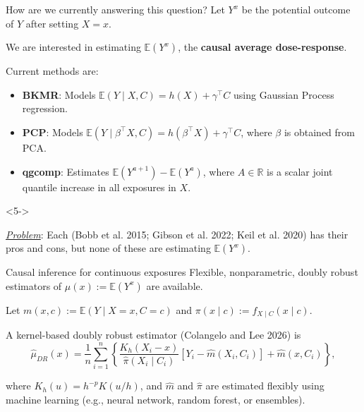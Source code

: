 \documentclass[
  ignorenonframetext,
  aspectratio=169,
  11pt]{beamer}
\newcounter{none} %
\providecommand{\tightlist}{%
  \setlength{\itemsep}{0pt}\setlength{\parskip}{0pt}}
\begin{document}
\begin{frame}{How are we currently answering this question?}
\protect{}\label{how-are-we-currently-answering-this-question}
Let \(Y^x\) be the potential outcome of \(Y\) after setting \(X=x\).

We are interested in estimating \(\mathbb{E}(Y^x)\), the
\textbf{causal average dose-response}.

\pause

Current methods are:

\begin{itemize}[<+->]
\tightlist
\item
  \textbf{BKMR}: Models \(\mathbb{E}(Y\mid X,C)=h(X)+\gamma^\top C\)
  using Gaussian Process regression.
\item
  \textbf{PCP}: Models
  \(\mathbb{E}(Y\mid \beta^\top X,C)=h(\beta^\top X)+\gamma^\top C\),
  where \(\beta\) is obtained from PCA.
\item
  \textbf{qgcomp}: Estimates \(\mathbb{E}(Y^{a+1})-\mathbb{E}(Y^a)\),
  where \(A\in\mathbb{R}\) is a scalar joint quantile increase in all
  exposures in \(X\).
\end{itemize}

\begin{uncoverenv}<5->

\underline{\textit{Problem}}: Each {\color{emoryblue}(Bobb et al. 2015;
Gibson et al. 2022; Keil et al. 2020)} has their pros and cons, but none
of these are estimating \(\mathbb{E}(Y^x)\).

\end{uncoverenv}
\end{frame}

\begin{frame}{Causal inference for continuous exposures}
\protect{}\label{causal-inference-for-continuous-exposures}
Flexible, nonparametric, doubly robust estimators of
\(\mu(x) := \mathbb{E}(Y^x)\) are available.

Let \(m(x,c) := \mathbb{E}(Y\mid X=x,C=c)\) and
\(\pi(x\mid c) := f_{X\mid C}(x\mid c)\).

\pause

A kernel-based doubly robust estimator {\color{emoryblue}(Colangelo and
Lee 2026)} is \[
\widehat{\mu}_{DR}(x)
=
\frac{1}{n}\sum_{i=1}^n
\left\{
\frac{K_h(X_i-x)}{\widehat{\pi}(X_i\mid C_i)}
[Y_i-\widehat m(X_i,C_i)]
+\widehat m(x,C_i)
\right\},
\]

where \(K_h(u)=h^{-p}K(u/h)\), and \(\widehat{m}\) and \(\widehat{\pi}\)
are estimated flexibly using machine learning (e.g., neural network,
random forest, or ensembles).
\end{frame}
\end{document}
